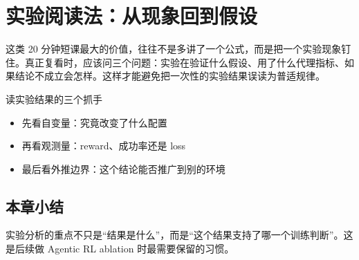 \section{实验阅读法：从现象回到假设}
这类 20 分钟短课最大的价值，往往不是多讲了一个公式，而是把一个实验现象钉住。真正复看时，应该问三个问题：实验在验证什么假设、用了什么代理指标、如果结论不成立会怎样。这样才能避免把一次性的实验结果误读为普适规律。

\begin{knowledgebox}{读实验结果的三个抓手}
\begin{itemize}
  \item 先看自变量：究竟改变了什么配置
  \item 再看观测量：reward、成功率还是 loss
  \item 最后看外推边界：这个结论能否推广到别的环境
\end{itemize}
\end{knowledgebox}

\subsection{本章小结}
实验分析的重点不只是“结果是什么”，而是“这个结果支持了哪一个训练判断”。这是后续做 Agentic RL ablation 时最需要保留的习惯。

\newpage
